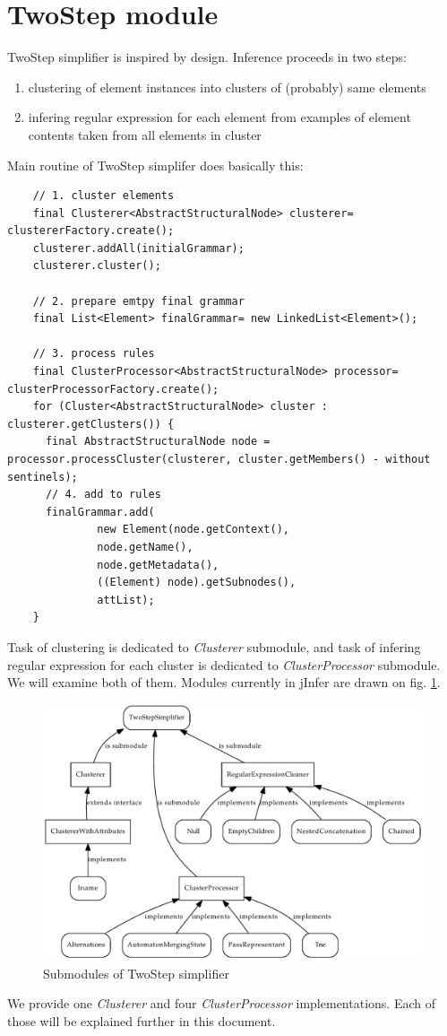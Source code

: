 \documentclass[a4paper,10pt,oneside]{article}
\newcommand{\myscale}{0.74}
\newcommand{\jmodule}[1]{\emph{#1}}
\begin{document}
\section{TwoStep module}
TwoStep simplifier is inspired by \cite{1802522} design. Inference proceeds in two steps:
\begin{enumerate}
	\item clustering of element instances into clusters of (probably) same elements
	\item infering regular expression for each element from examples of element contents taken from all elements in cluster
\end{enumerate}
Main routine of TwoStep simplifer does basically this:
\begin{verbatim}
    // 1. cluster elements
    final Clusterer<AbstractStructuralNode> clusterer= clustererFactory.create();
    clusterer.addAll(initialGrammar);
    clusterer.cluster();

    // 2. prepare emtpy final grammar
    final List<Element> finalGrammar= new LinkedList<Element>();

    // 3. process rules
    final ClusterProcessor<AbstractStructuralNode> processor= clusterProcessorFactory.create();
    for (Cluster<AbstractStructuralNode> cluster : clusterer.getClusters()) {
      final AbstractStructuralNode node =  processor.processCluster(clusterer, cluster.getMembers() - without sentinels);
      // 4. add to rules
      finalGrammar.add(
              new Element(node.getContext(),
              node.getName(),
              node.getMetadata(),
              ((Element) node).getSubnodes(),
              attList);
    }
\end{verbatim}
Task of clustering is dedicated to \jmodule{Clusterer} submodule, and task of infering regular expression for each cluster is dedicated to \jmodule{ClusterProcessor} submodule. We will examine both of them.
Modules currently in jInfer are drawn on fig. \ref{twostep_modules}.
\begin{figure}
	\centering\includegraphics[scale=\myscale]{twostep_modules}
	\caption{Submodules of TwoStep simplifier} \label{twostep_modules}
\end{figure}
We provide one \jmodule{Clusterer} and four \jmodule{ClusterProcessor} implementations.
Each of those will be explained further in this document.
\end{document}
